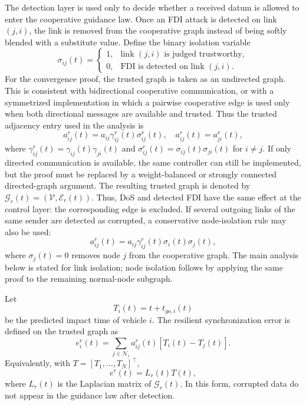 \documentclass[lettersize,journal]{IEEEtran}
\begin{document}
The detection layer is used only to decide whether a received datum is allowed to enter the cooperative guidance law. Once an FDI attack is detected on link $(j,i)$, the link is removed from the cooperative graph instead of being softly blended with a substitute value. Define the binary isolation variable
\begin{equation}
    \sigma_{ij}(t)=
    \begin{cases}
        1, & \text{link }(j,i)\text{ is judged trustworthy},\\
        0, & \text{FDI is detected on link }(j,i).
    \end{cases}
    \label{eq:fdi_isolation}
\end{equation}
For the convergence proof, the trusted graph is taken as an undirected graph. This is consistent with bidirectional cooperative communication, or with a symmetrized implementation in which a pairwise cooperative edge is used only when both directional messages are available and trusted. Thus the trusted adjacency entry used in the analysis is
\begin{equation}
    a_{ij}^{r}(t)
    =
    a_{ij}
    \gamma_{ij}^{r}(t)
    \sigma_{ij}^{r}(t),
    \quad
    a_{ij}^{r}(t)=a_{ji}^{r}(t),
    \label{eq:trusted_adjacency}
\end{equation}
where $\gamma_{ij}^{r}(t)=\gamma_{ij}(t)\gamma_{ji}(t)$ and $\sigma_{ij}^{r}(t)=\sigma_{ij}(t)\sigma_{ji}(t)$ for $i\ne j$. If only directed communication is available, the same controller can still be implemented, but the proof must be replaced by a weight-balanced or strongly connected directed-graph argument. The resulting trusted graph is denoted by $\mathcal{G}_r(t)=(\mathcal{V},\mathcal{E}_r(t))$. Thus, DoS and detected FDI have the same effect at the control layer: the corresponding edge is excluded. If several outgoing links of the same sender are detected as corrupted, a conservative node-isolation rule may also be used:
\begin{equation}
    a_{ij}^{r}(t)
    =
    a_{ij}
    \gamma_{ij}^{r}(t)
    \sigma_i(t)\sigma_j(t),
    \label{eq:node_isolation}
\end{equation}
where $\sigma_j(t)=0$ removes node $j$ from the cooperative graph. The main analysis below is stated for link isolation; node isolation follows by applying the same proof to the remaining normal-node subgraph.

Let
\begin{equation}
    T_i(t)=t+t_{go,i}(t)
    \label{eq:impact_time}
\end{equation}
be the predicted impact time of vehicle $i$. The resilient synchronization error is defined on the trusted graph as
\begin{equation}
    e_i^{r}(t)
    =
    \sum_{j\in\mathcal{N}_i}
    a_{ij}^{r}(t)
    \left[T_i(t)-T_j(t)\right].
    \label{eq:resilient_error}
\end{equation}
Equivalently, with $T=[T_1,\ldots,T_N]^\top$,
\begin{equation}
    e^{r}(t)=L_r(t)T(t),
    \label{eq:trusted_laplacian_error}
\end{equation}
where $L_r(t)$ is the Laplacian matrix of $\mathcal{G}_r(t)$. In this form, corrupted data do not appear in the guidance law after detection.
\end{document}
